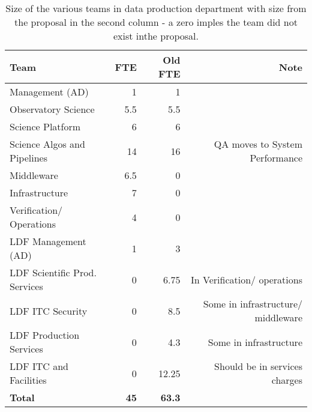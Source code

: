 \begin{longtable} { |p{}  |r  |r  |r |} 
\caption{Size of the various teams in data production department with size from the proposal in the second column - a zero imples the team did not exist inthe proposal. \label{tab:FTE}}\\ 
\hline 
\textbf{Team}&\textbf{FTE }&\textbf{Old FTE }&\textbf{Note} \\ \hline
{Management (AD)}&{1}&{1}& \\ \hline
{Observatory Science }&{5.5}&{5.5}& \\ \hline
{Science Platform}&{6}&{6}& \\ \hline
{Science Algos and Pipelines}&{14}&{16}&{QA moves to System Performance} \\ \hline
{Middleware}&{6.5}&{0}& \\ \hline
{Infrastructure}&{7}&{0}& \\ \hline
{Verification/ Operations}&{4}&{0}& \\ \hline
{LDF Management (AD) }&{1}&{3}& \\ \hline
{LDF Scientific Prod. Services}&{0}&{6.75}&{In Verification/ operations} \\ \hline
{LDF ITC Security}&{0}&{8.5}&{Some in infrastructure/ middleware } \\ \hline
{LDF Production Services}&{0}&{4.3}&{Some in infrastructure} \\ \hline
{LDF ITC and Facilities}&{0}&{12.25}&{Should be in services charges} \\ \hline
\textbf{Total}&\textbf{45}&\textbf{63.3}& \\ \hline
\end{longtable}
